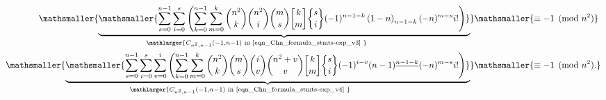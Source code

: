 \documentclass[12pt,reqno]{article}
\numberwithin{sfootnote}{section}
\numberwithin{equation}{section}
\theoremstyle{plain}
\theoremstyle{definition}
\theoremstyle{remark}
\newcommand{\undersetbrace}[2]{\ensuremath{\underset{\mathlarger{#1}}{\mathsmaller{\underbrace{#2}}}}}
\newcommand{\gkpSI}[2]{\ensuremath{\genfrac{\lbrack}{\rbrack}{0pt}{}{#1}{#2}}}
\newcommand{\gkpSII}[2]{\ensuremath{\genfrac{\{}{\}}{0pt}{}{#1}{#2}}}
\newcommand{\FFactII}[2]{\ensuremath{#1^{\underline{#2}}}}
\newcommand{\Pochhammer}[2]{\ensuremath{\left(#1\right)_{#2}}}
\begin{document}
\begin{align*} 
\undersetbrace{C_{n^2,n-1}(-1, n-1) 
     \text{ in \eqref{eqn_Chn_formula_stmts-exp_v3} }}{ 
     \mathsmaller{ 
     \sum\limits_{s=0}^{n-1} \sum\limits_{i=0}^{s} \left( 
     \sum\limits_{k=0}^{n-1} \sum\limits_{m=0}^{k} 
     \binom{n^2}{k} \binom{n^2}{i} \binom{m}{s} 
     \gkpSI{k}{m} \gkpSII{s}{i} (-1)^{n-1-k} 
     \Pochhammer{1-n}{n-1-k} (-n)^{m-s} i! 
     \right)} 
     } 
     & 
     \mathsmaller{ 
     \equiv -1 \pmod{n^2} 
     } \\ 
     \undersetbrace{C_{n^2,n-1}(-1, n-1) 
     \text{ in \eqref{eqn_Chn_formula_stmts-exp_v4} }}{ 
\mathsmaller{ 
     \sum\limits_{s=0}^{n-1} \sum\limits_{i=0}^{s} \sum\limits_{v=0}^{i} 
     \left( 
     \sum\limits_{k=0}^{n-1} \sum\limits_{m=0}^{k} 
     \binom{n^2}{k} \binom{m}{s} \binom{i}{v} \binom{n^2+v}{v} 
     \gkpSI{k}{m} \gkpSII{s}{i} (-1)^{i-v} 
     \FFactII{(n-1)}{n-1-k} (-n)^{m-s} i! 
     \right)} 
     } 
     & 
     \mathsmaller{ 
     \equiv -1 \pmod{n^2}. 
     } 
\end{align*} 
\end{document}
